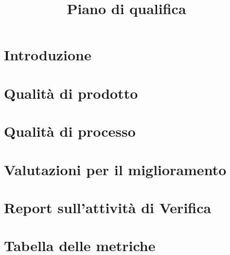 \documentclass{article}
\title{Piano di qualifica}
\begin{document}


\newpage
\section{Introduzione}%
\label{sec:introduzione}



\newpage
\section{Qualità di prodotto}%
\label{sec:qualita_di_prodotto}



\newpage
\section{Qualità di processo}%
\label{sec:qualita_di_processo}



\newpage
\section{Valutazioni per il miglioramento}%
\label{sec:valutazioni_miglioramento}




\newpage
\section{Report sull'attività di Verifica}%
\label{sec:report_verifica}



\newpage
\section{Tabella delle metriche}%
\label{sec:tabella_metriche}



\end{document}
